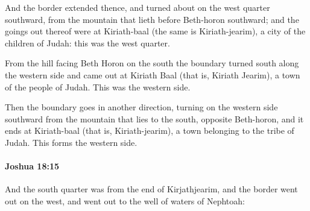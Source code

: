 			\begin{versebox}
					\item[BHS] 
					\item[ASV] And the border extended thence, and turned about on the west quarter southward, from the mountain that lieth before Beth-horon southward; and the goings out thereof were at Kiriath-baal (the same is Kiriath-jearim), a city of the children of Judah: this was the west quarter.
					\item[NIV] From the hill facing Beth Horon on the south the boundary turned south along the western side and came out at Kiriath Baal (that is, Kiriath Jearim), a town of the people of Judah. This was the western side.
					\item[NRSV] Then the boundary goes in another direction, turning on the western side southward from the mountain that lies to the south, opposite Beth-horon, and it ends at Kiriath-baal (that is, Kiriath-jearim), a town belonging to the tribe of Judah. This forms the western side.
			\end{versebox}

		\paragraph{Joshua 18:15} %
			\label{JOSHUA-18-15}

			And the south quarter was from the end of Kirjathjearim, and the border went out on the west, and went out to the well of waters of Nephtoah:

